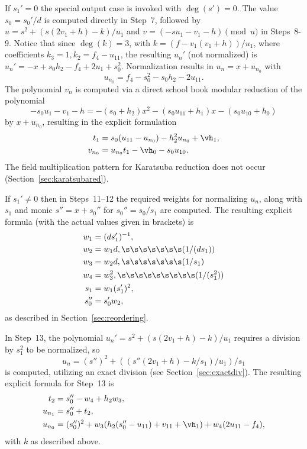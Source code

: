 If $s_1' = 0$ the special output case is invoked with $\deg(s') = 0$. The value
$s_0 = s_0'/d$ is computed directly in Step~7, followed by $u = s^2 + (s(2v_1 +
h) - k)/u_1$ and $v = (-su_1 - v_1 - h) \pmod{u}$ in Steps~8-9. Notice that
since $\deg(k) = 3$, with $k = (f - v_1(v_1 + h))/u_1$, where coefficients $k_3
= 1, k_2 = f_4 - u_{11}$, the resulting $u_n'$ (not normalized) is $u_n' = -x +
s_0h_2 - f_4 + 2u_1 + s_0^2.$ Normalization results in $u_n = x + u_{n_0}$ with
$$u_{n_0} = f_4 - s_0^2 - s_0h_2 - 2u_{11}.$$ The polynomial $v_n$ is computed
via a direct school book modular reduction of the polynomial $$-s_0u_1 - v_1 - h
= -(s_0 + h_2)x^2 - (s_0u_{11} + h_1)x - (s_0u_{10} + h_0)$$ by $x + u_{n_0}$,
resulting in the explicit formulation
\begin{align*} 
    t_1     &= s_0(u_{11} - u_{n_0}) - h_2^2u_{n_0} + \vh_1,\\
    v_{n_0} &= u_{n_0}t_1 - \vh_0 - s_0u_{10}.    
\end{align*} 
The field multiplication pattern for Karatsuba reduction does not occur
(Section~\ref{sec:karatsubared}).

If $s_1' \neq 0$ then in Steps~11--12 the required weights for normalizing $u_n$, along with
$s_1$ and monic $s'' = x + s_0''$ for $s_0'' = s_0/s_1$ are computed. The
resulting explicit formula (with the actual
values given in brackets) is
\begin{align*} 
    w_1 &= (ds_1')^{-1},\\
    w_2 &= w_1d, \s\s\s\s\s\s\s (1/(ds_1))\\
    w_3 &= w_2d, \s\s\s\s\s\s\s (1/s_1)\\
    w_4 &= w_3^2, \s\s\s\s\s\s\s\s\s (1/(s_1^2))\\
    s_1 &= w_1(s_1')^2,\\
    s_0'' &= s_0'w_2, \end{align*} as described in Section~\ref{sec:reordering}. 

In Step~13, the polynomial $u_n' = s^2 + (s(2v_1 + h) - k)/u_1$ requires a
division by $s_1^2$ to be normalized, so 
$$ u_n = (s'')^2 + ((s''(2v_1+ h) - k/s_1)/u_1)/s_1$$ is computed, utilizing an
exact division (see Section~\ref{sec:exactdiv}). The resulting explicit formula
for Step~13 is 
\begin{align*}
    t_2 &= s_0''- w_4 + h_2w_3,\\
    u_{n_1} &= s_0'' + t_2,\\
    u_{n_0} &= (s_0'')^2 + w_3(h_2(s_0'' - u_{11}) + v_{11} + \vh_1) + w_4(2u_{11} - f_4),
\end{align*}
with $k$ as described above. 

